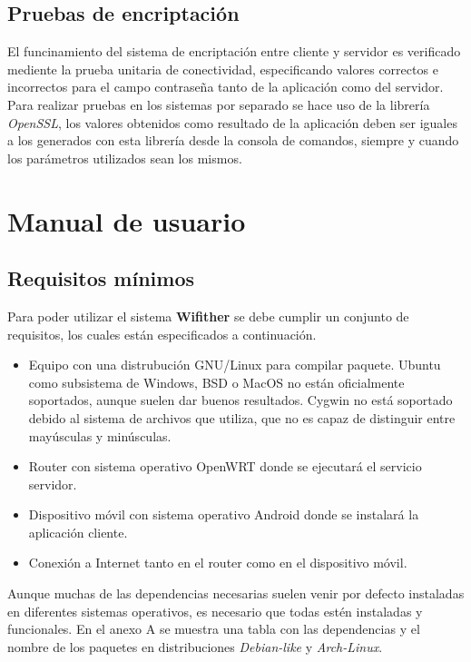 \documentclass[12pt, twoside]{article}
\begin{document}
    \subsection{Pruebas de encriptación}
    El funcinamiento del sistema de encriptación entre cliente y servidor es verificado mediente la prueba unitaria de conectividad, especificando valores correctos e incorrectos para el campo contraseña tanto de la aplicación como del servidor. Para realizar pruebas en los sistemas por separado se hace uso de la librería \textit{OpenSSL}, los valores obtenidos como resultado de la aplicación deben ser iguales a los generados con esta librería desde la consola de comandos, siempre y cuando los parámetros utilizados sean los mismos. 

\cleardoublepage \section{Manual de usuario} \label{sec:man}
    \subsection{Requisitos mínimos}
        Para poder utilizar el sistema \textbf{Wifither} se debe cumplir un conjunto de requisitos, los cuales están especificados a continuación.

        \begin{itemize}
            \item Equipo con una distrubución GNU/Linux para compilar paquete. Ubuntu como subsistema de Windows, BSD o MacOS no están oficialmente soportados, aunque suelen dar buenos resultados. Cygwin no está soportado debido al sistema de archivos que utiliza, que no es capaz de distinguir entre mayúsculas y minúsculas.
            \item Router con sistema operativo OpenWRT donde se ejecutará el servicio servidor.
            \item Dispositivo móvil con sistema operativo Android donde se instalará la aplicación cliente.
            \item Conexión a Internet tanto en el router como en el dispositivo móvil.
        \end{itemize}

        Aunque muchas de las dependencias necesarias suelen venir por defecto instaladas en diferentes sistemas operativos, es necesario que todas estén instaladas y funcionales. En el anexo A se muestra una tabla con las dependencias y el nombre de los paquetes en distribuciones \textit{Debian-like} y \textit{Arch-Linux}.
\end{document}
